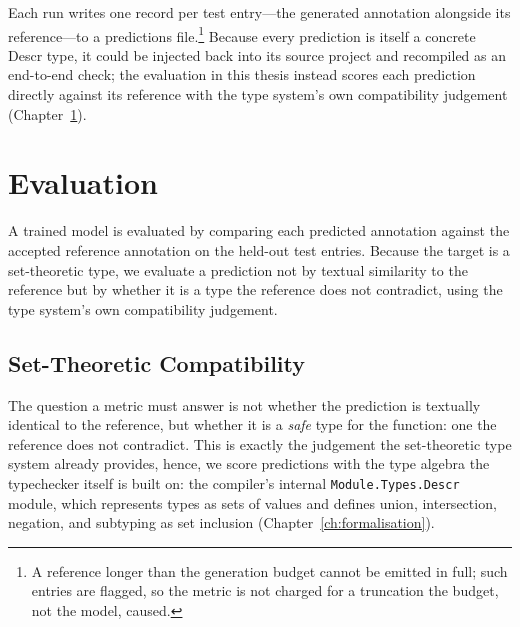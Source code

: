 Each run writes one record per test entry---the generated annotation alongside its reference---to a predictions file.\footnote{A reference longer than the generation budget cannot be emitted in full; such entries are flagged, so the metric is not charged for a truncation the budget, not the model, caused.}
Because every prediction is itself a concrete Descr type, it could be injected back into its source project and recompiled as an end-to-end check; the evaluation in this thesis instead scores each prediction directly against its reference with the type system's own compatibility judgement (Chapter~\ref{ch:llm-eval}).

\chapter{Evaluation}
\label{ch:llm-eval}

A trained model is evaluated by comparing each predicted annotation against the accepted reference annotation on the held-out test entries.
Because the target is a set-theoretic type, we evaluate a prediction not by textual similarity to the reference but by whether it is a type the reference does not contradict, using the type system's own compatibility judgement.

\section{Set-Theoretic Compatibility}
\label{sec:compatibility-eval}

The question a metric must answer is not whether the prediction is textually identical to the reference, but whether it is a \emph{safe} type for the function: one the reference does not contradict.
This is exactly the judgement the set-theoretic type system already provides, hence, we score predictions with the type algebra the typechecker itself is built on: the compiler's internal \texttt{Module.Types.Descr} module, which represents types as sets of values and defines union, intersection, negation, and subtyping as set inclusion (Chapter~\ref{ch:formalisation}).

